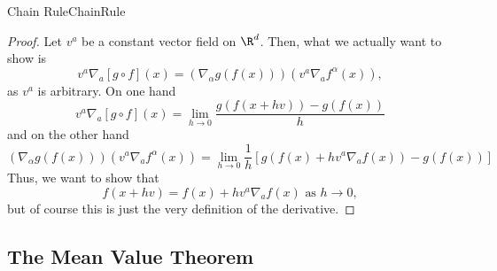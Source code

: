 \begin{prp}{Chain Rule}{ChainRule}
\begin{proof}
Let $v^a$ be a constant vector field on $\R ^d$.  Then, what we actually want to show is
\begin{equation}
v^a\nabla _a[g\circ f](x)=\left( \nabla _\alpha g(f(x))\right) \left( v^a\nabla _af^\alpha (x)\right) ,
\end{equation}
as $v^a$ is arbitrary.  On one hand
\begin{equation}\label{5.2.18}
v^a\nabla _a[g\circ f](x)=\lim _{h\to 0}\frac{g\left( f(x+hv)\right) -g(f(x))}{h}
\end{equation}
and on the other hand
\begin{equation}
\left( \nabla _\alpha g(f(x))\right) \left( v^a\nabla _af^\alpha (x)\right) =\lim _{h\to 0}\frac{1}{h}\left[ g\left( f(x)+hv^a\nabla _af(x)\right) -g(f(x))\right]
\end{equation}
Thus, we want to show that
\begin{equation}
f(x+hv)=f(x)+hv^a\nabla _af(x)\text{ as }h\to 0,
\end{equation}
but of course this is just the very definition of the derivative.
\end{proof}
\end{prp}

\subsection{The Mean Value Theorem}

